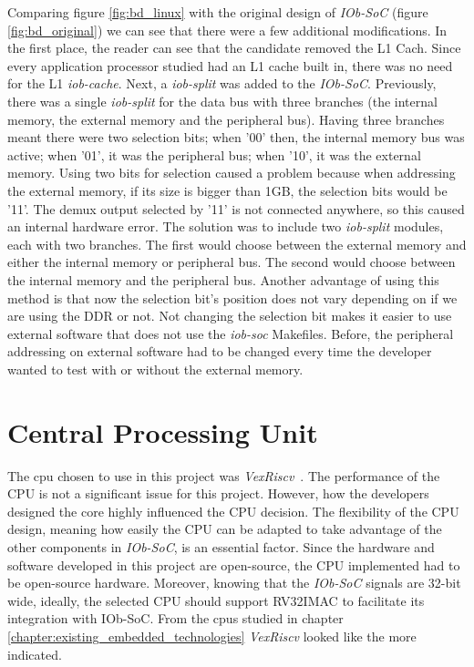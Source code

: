 Comparing figure \ref{fig:bd_linux} with the original design of \textit{IOb-SoC} (figure \ref{fig:bd_original}) we can see that there were a few additional modifications. In the first place, the reader can see that the candidate removed the L1 Cach. Since every application processor studied had an L1 cache built in, there was no need for the L1 \textit{iob-cache}. Next, a \textit{iob-split} was added to the \textit{IOb-SoC}. Previously, there was a single \textit{iob-split} for the data bus with three branches (the internal memory, the external memory and the peripheral bus). Having three branches meant there were two selection bits; when '00' then, the internal memory bus was active; when '01', it was the peripheral bus; when '10', it was the external memory. Using two bits for selection caused a problem because when addressing the external memory, if its size is bigger than 1GB, the selection bits would be '11'. The \acrfull{demux} output selected by '11' is not connected anywhere, so this caused an internal hardware error. The solution was to include two \textit{iob-split} modules, each with two branches. The first would choose between the external memory and either the internal memory or peripheral bus. The second would choose between the internal memory and the peripheral bus. Another advantage of using this method is that now the selection bit's position does not vary depending on if we are using the DDR or not. Not changing the selection bit makes it easier to use external software that does not use the \textit{iob-soc} Makefiles. Before, the peripheral addressing on external software had to be changed every time the developer wanted to test with or without the external memory.

\section{Central Processing Unit}
\label{section:cpu}
The \acrshort{cpu} chosen to use in this project was \textit{VexRiscv}~\cite{vexriscv}. The performance of the CPU is not a significant issue for this project. However, how the developers designed the core highly influenced the CPU decision. The flexibility of the CPU design, meaning how easily the CPU can be adapted to take advantage of the other components in \textit{IOb-SoC}, is an essential factor. Since the hardware and software developed in this project are open-source, the CPU implemented had to be open-source hardware. Moreover, knowing that the \textit{IOb-SoC} signals are 32-bit wide, ideally, the selected CPU should support RV32IMAC to facilitate its integration with IOb-SoC. From the \acrshort{cpu}s studied in chapter \ref{chapter:existing_embedded_technologies} \textit{VexRiscv} looked like the more indicated.


